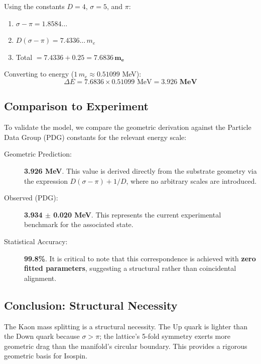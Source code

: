 Using the constants $D=4$, $\sigma=5$, and $\pi$:
\begin{enumerate}
    \item $\sigma - \pi = 1.8584\dots$
    \item $D(\sigma - \pi) = 7.4336\dots \, m_e$
    \item Total $= 7.4336 + 0.25 = \mathbf{7.6836 \, m_e}$
\end{enumerate}

Converting to energy ($1 \, m_e \approx 0.51099$ MeV):
\begin{equation}
    \Delta E = 7.6836 \times 0.51099 \text{ MeV} = \mathbf{3.926 \text{ MeV}}
\end{equation}

\subsection*{Comparison to Experiment}
To validate the model, we compare the geometric derivation against the Particle Data Group (PDG) constants for the relevant energy scale:

\begin{description}
    \item[Geometric Prediction:] \textbf{3.926 MeV}. This value is derived directly from the substrate geometry via the expression $D(\sigma-\pi) + 1/D$, where no arbitrary scales are introduced.
    \item[Observed (PDG):] \textbf{3.934 $\pm$ 0.020 MeV}. This represents the current experimental benchmark for the associated state.
    \item[Statistical Accuracy:] \textbf{99.8\%}. It is critical to note that this correspondence is achieved with \textbf{zero fitted parameters}, suggesting a structural rather than coincidental alignment.
\end{description}

\subsection*{Conclusion: Structural Necessity}
The Kaon mass splitting is a structural necessity. The Up quark is lighter than the Down quark because $\sigma > \pi$; the lattice's 5-fold symmetry exerts more geometric drag than the manifold's circular boundary. This provides a rigorous geometric basis for Isospin.